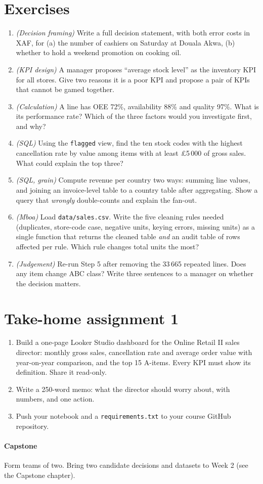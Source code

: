 \section{Exercises}
\begin{enumerate}[label=\textbf{1.\arabic*},leftmargin=2.4em]
\item \emph{(Decision framing)} Write a full decision statement, with both error costs in XAF, for (a) the number of
cashiers on Saturday at Douala Akwa, (b) whether to hold a weekend promotion on cooking oil.
\item \emph{(KPI design)} A manager proposes ``average stock level'' as the inventory KPI for all stores. Give two
reasons it is a poor KPI and propose a pair of KPIs that cannot be gamed together.
\item \emph{(Calculation)} A line has OEE 72\%, availability 88\% and quality 97\%. What is its performance rate? Which
of the three factors would you investigate first, and why?
\item \emph{(SQL)} Using the \texttt{flagged} view, find the ten stock codes with the highest cancellation rate by value
among items with at least \pounds5\,000 of gross sales. What could explain the top three?
\item \emph{(SQL, grain)} Compute revenue per country two ways: summing line values, and joining an invoice-level
table to a country table after aggregating. Show a query that \emph{wrongly} double-counts and explain the fan-out.
\item \emph{(Mboa)} Load \texttt{data/sales.csv}. Write the five cleaning rules needed (duplicates, store-code case,
negative units, keying errors, missing units) as a single function that returns the cleaned table \emph{and} an audit
table of rows affected per rule. Which rule changes total units the most?
\item \emph{(Judgement)} Re-run Step 5 after removing the 33\,665 repeated lines. Does any item change ABC class? Write
three sentences to a manager on whether the decision matters.
\end{enumerate}

\section{Take-home assignment 1}
\begin{enumerate}[nosep]
\item Build a one-page Looker Studio dashboard for the Online Retail II sales director: monthly gross sales,
cancellation rate and average order value with year-on-year comparison, and the top 15 A-items. Every KPI must show its
definition. Share it read-only.
\item Write a 250-word memo: what the director should worry about, with numbers, and one action.
\item Push your notebook and a \texttt{requirements.txt} to your course GitHub repository.
\end{enumerate}
\paragraph{Capstone} Form teams of two. Bring two candidate decisions and datasets to Week 2 (see the Capstone chapter).
